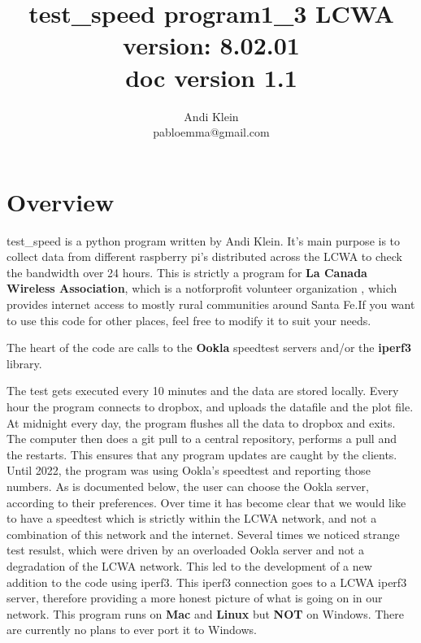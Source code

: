 \documentclass[11pt]{article}
\begin{document}
\author{ Andi Klein \\ pabloemma@gmail.com}
\title{ test\_speed program1\_3 LCWA \\ 
		\bf{version: 8.02.01} \\
		doc version 1.1}
\maketitle
\setcounter{secnumdepth}{10}
\setcounter{tocdepth}{10}

\tableofcontents
\newpage

\newenvironment{andilist}{\begin{itemize} \em}{\end{itemize}}



\section{Overview}
test\_speed is a python program written by Andi Klein. It's main purpose is to collect data from different raspberry pi's distributed across the LCWA to check the bandwidth over 24 hours. This is strictly a program for \textbf{La Canada Wireless Association}, which is a notforprofit volunteer organization , which provides internet access to mostly rural communities around Santa Fe.If you want to use this code for other places, feel free to modify it to suit your needs.

The heart of the code are calls to the \textbf{Ookla} speedtest servers and/or the \textbf{iperf3} library. 

The test gets executed every 10 minutes and the data are stored locally. Every hour the program connects to dropbox, and uploads the datafile and the plot file. At midnight every day, the program flushes all the data to dropbox and exits. The computer then does a git pull to a central repository, performs a pull and the restarts. This ensures that any program updates are caught by the clients.
Until 2022, the program was using Ookla's speedtest and reporting those numbers. As is documented below, the user can choose the Ookla server, according to their preferences. Over time it has become clear that we would like to have a speedtest which is strictly within the LCWA network, and not a combination of this network and the internet. Several times we noticed strange test resulst, which were driven by an overloaded Ookla server and not a degradation of the LCWA network. This led to the development of a new addition to the code using iperf3. This iperf3 connection goes to a LCWA iperf3 server, therefore providing a more honest picture of what is going on in our network. This program runs on \textbf{Mac} and \textbf{Linux} but \textbf{NOT} on Windows. There are currently no plans to ever port it to Windows.
\end{document}
